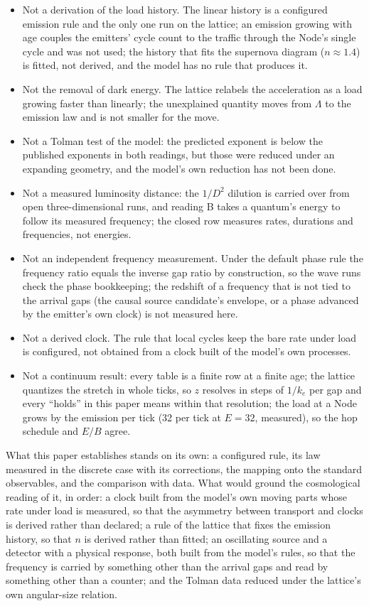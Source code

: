 \documentclass[11pt]{article}
\begin{document}
\begin{itemize}
\item Not a derivation of the load history. The linear history is a
configured emission rule and the only one run on the lattice; an emission
growing with age couples the emitters' cycle count to the traffic through the
Node's single cycle and was not used; the history that fits the supernova
diagram ($n \approx 1.4$) is fitted, not derived, and the model has no rule
that produces it.
\item Not the removal of dark energy. The lattice relabels the acceleration
as a load growing faster than linearly; the unexplained quantity moves from
$\Lambda$ to the emission law and is not smaller for the move.
\item Not a Tolman test of the model: the predicted exponent is below the
published exponents in both readings, but those were reduced under an
expanding geometry, and the model's own reduction has not been done.
\item Not a measured luminosity distance: the $1/D^2$ dilution is carried
over from open three-dimensional runs, and reading B takes a quantum's
energy to follow its measured frequency; the closed row measures rates,
durations and frequencies, not energies.
\item Not an independent frequency measurement. Under the default phase
rule the frequency ratio equals the inverse gap ratio by construction, so
the wave runs check the phase bookkeeping; the redshift of a frequency
that is not tied to the arrival gaps (the causal source candidate's
envelope, or a phase advanced by the emitter's own clock) is not measured
here.
\item Not a derived clock. The rule that local cycles keep the bare rate
under load is configured, not obtained from a clock built of the model's
own processes.
\item Not a continuum result: every table is a finite row at a finite age;
the lattice quantizes the stretch in whole ticks, so $z$ resolves in steps of
$1/k_e$ per gap and every ``holds'' in this paper means within that
resolution; the load at a Node grows by the emission per tick (32 per tick
at $E = 32$, measured), so the hop schedule and $E/B$ agree.

\end{itemize}

What this paper establishes stands on its own: a configured rule, its
law measured in the discrete case with its corrections, the mapping onto
the standard observables, and the comparison with data. What would ground
the cosmological reading of it, in order: a clock built from the model's
own moving parts whose rate under load is measured, so that the asymmetry
between transport and clocks is derived rather than declared; a rule of
the lattice that fixes the emission history, so that $n$ is derived rather
than fitted; an oscillating source and a detector with a physical
response, both built from the model's rules, so that the frequency is
carried by something other than the arrival gaps and read by something
other than a counter; and the Tolman data reduced under the lattice's own
angular-size relation.
\end{document}
